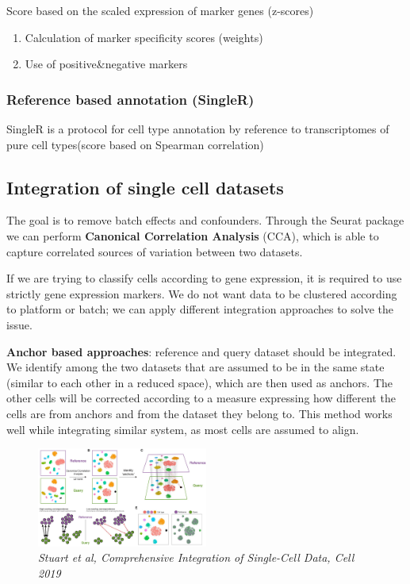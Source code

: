 Score based on the scaled expression of marker genes (z-scores)

\begin{enumerate}
\def\labelenumi{\arabic{enumi}.}
\tightlist
\item
  Calculation of marker specificity scores (weights)
\item
  Use of positive\&negative markers
\end{enumerate}

\hypertarget{reference-based-annotation-singler}{%
\subsubsection{Reference based annotation
(SingleR)}\label{reference-based-annotation-singler}}

SingleR is a protocol for cell type annotation by reference to
transcriptomes of pure cell types(score based on Spearman correlation)

\hypertarget{integration-of-single-cell-datasets}{%
\subsection{Integration of single cell
datasets}\label{integration-of-single-cell-datasets}}

The goal is to remove batch effects and confounders. Through the Seurat
package we can perform \textbf{Canonical Correlation Analysis} (CCA),
which is able to capture correlated sources of variation between two
datasets.

If we are trying to classify cells according to gene expression, it is
required to use strictly gene expression markers. We do not want data to
be clustered according to platform or batch; we can apply different
integration approaches to solve the issue.

\textbf{Anchor based approaches}: reference and query dataset should be
integrated. We identify among the two datasets that are assumed to be in
the same state (similar to each other in a reduced space), which are
then used as anchors. The other cells will be corrected according to a
measure expressing how different the cells are from anchors and from the
dataset they belong to. This method works well while integrating similar
system, as most cells are assumed to align.

\begin{figure}
\centering
\includegraphics[width=0.5\textwidth]{images/Screenshot-4.png}
\caption{\emph{Stuart et al, Comprehensive Integration of Single-Cell
Data, Cell 2019}}
\end{figure}

